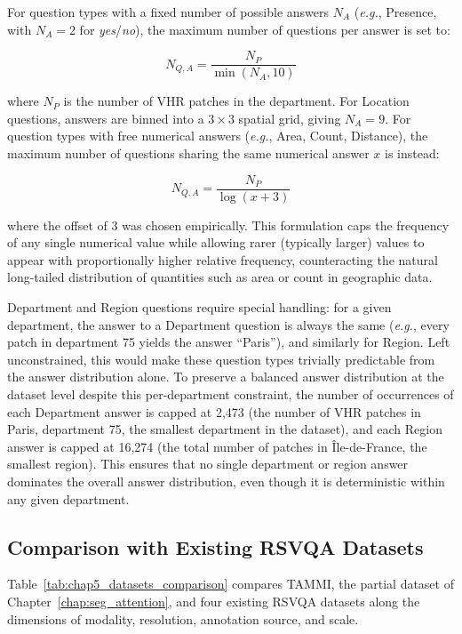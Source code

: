 For question types with a fixed number of possible answers
$N_A$ (\textit{e.g.}, Presence, with $N_A = 2$ for
\textit{yes}/\textit{no}), the maximum number of questions per
answer is set to:

\begin{equation}
    N_{Q,A} = \frac{N_P}{\min(N_A, 10)}
\end{equation}

where $N_P$ is the number of VHR patches in the department.
For Location questions, answers are binned into a $3 \times 3$
spatial grid, giving $N_A = 9$. For question types with free
numerical answers (\textit{e.g.}, Area, Count, Distance), the
maximum number of questions sharing the same numerical answer
$x$ is instead:

\begin{equation}
    N_{Q,A} = \frac{N_P}{\log(x + 3)}
\end{equation}

where the offset of 3 was chosen empirically. This formulation
caps the frequency of any single numerical value while
allowing rarer (typically larger) values to appear with
proportionally higher relative frequency, counteracting the
natural long-tailed distribution of quantities such as area or
count in geographic data.

Department and Region questions require special handling: for
a given department, the answer to a Department question is
always the same (\textit{e.g.}, every patch in department 75
yields the answer ``Paris''), and similarly for Region. Left
unconstrained, this would make these question types trivially
predictable from the answer distribution alone. To preserve a
balanced answer distribution at the dataset level despite this
per-department constraint, the number of occurrences of each
Department answer is capped at 2,473 (the number of VHR
patches in Paris, department 75, the smallest department in
the dataset), and each Region answer is capped at 16,274
(the total number of patches in Île-de-France, the smallest
region). This ensures that no single department or region
answer dominates the overall answer distribution, even though
it is deterministic within any given department.

\subsection{Comparison with Existing RSVQA Datasets}
\label{sec:chap5_comparison}

Table~\ref{tab:chap5_datasets_comparison} compares TAMMI, the
partial dataset of Chapter~\ref{chap:seg_attention}, and four
existing RSVQA datasets along the dimensions of modality,
resolution, annotation source, and scale.

